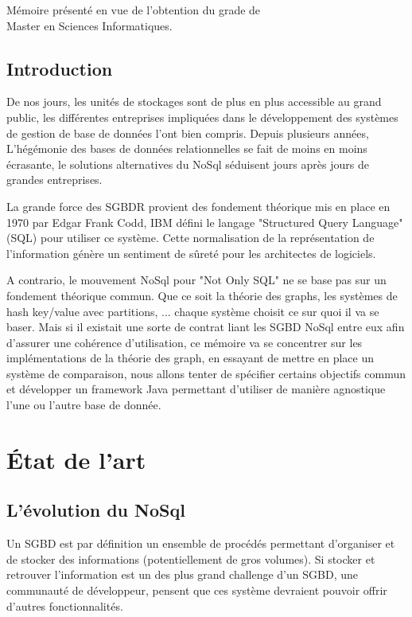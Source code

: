 \documentclass[a4paper,fleqn,12pt]{report}
\begin{document}
\vspace{0.5cm}
\begin{center}
M\'emoire pr\'esent\'e en vue de l'obtention du grade de\\
Master en Sciences Informatiques.
\end{center}
\tableofcontents
\newpage


\chapter*{Introduction}

De nos jours, les unités de stockages sont de plus en plus accessible au grand public, les différentes entreprises impliquées dans le développement des systèmes de gestion de base de données l'ont bien compris. Depuis plusieurs années, L'hégémonie des bases de données relationnelles se fait de moins en moins écrasante, le solutions alternatives du NoSql séduisent jours après jours de grandes entreprises. 

La grande force des SGBDR provient des fondement théorique mis en place en 1970 par Edgar Frank Codd, IBM défini le langage "Structured Query Language" (SQL) pour utiliser ce système. Cette normalisation de la représentation de l'information génère un sentiment de sûreté pour les architectes de logiciels.

A contrario, le mouvement NoSql pour "Not Only SQL" ne se base pas sur un fondement théorique commun. Que ce soit la théorie des graphs, les systèmes de hash key/value avec partitions, ... chaque système choisit ce sur quoi il va se baser. Mais si il existait une sorte de contrat liant les SGBD NoSql entre eux afin d'assurer une cohérence d'utilisation, ce mémoire va se concentrer sur les implémentations de la théorie des graph, en essayant de mettre en place un système de comparaison, nous allons tenter de spécifier certains objectifs commun et développer un framework Java permettant d'utiliser de manière agnostique l'une ou l'autre base de donnée.
 
\part{État de l'art}

\chapter{L'évolution du NoSql}
\label{NoSqlEvol}

Un SGBD est par définition un ensemble de procédés permettant d'organiser et de stocker des informations (potentiellement de gros volumes). Si stocker et retrouver l'information est un des plus grand challenge d'un SGBD, une communauté de développeur, pensent que ces système devraient pouvoir offrir d'autres fonctionnalités. 
\end{document}
